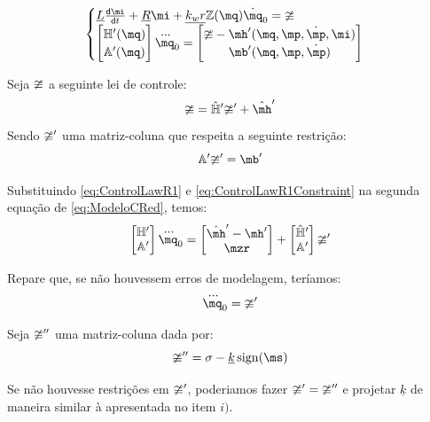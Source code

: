 \documentclass[a4paper,11pt,brazil,fleqn]{article}
\begin{document}
\begin{itemize}
$$
\begin{cases}
\underline{L} \frac{\dd \mi}{\dd t} + \underline{R} \mi + \underline{k_w r} \mZ (\mq) \dot{\mq}_0= \mup
\\
\begin{bmatrix}
\mH'(\mq) \\
\mA'(\mq)
\end{bmatrix}
\dddot{\mq}_0
=
\begin{bmatrix}
\mup - \mh'(\mq,\mp,\dot{\mp}, \mi) \\
\mb'(\mq,\mp,\dot{\mp})
\end{bmatrix}
\end{cases}
$$

Seja $\mathbb{\upsilon}$ a seguinte lei de controle:
\begin{equation} \label{eq:ControlLawR1}
\mup = \hat{\mH}' \mup' + \hat{\mh}'
\end{equation}
Sendo $\mathbb{\upsilon}'$ uma matriz-coluna que respeita a seguinte restri\c{c}\~ao:
\begin{equation} \label{eq:ControlLawR1Constraint}
\mA' \mup' = \mb'
\end{equation}

Substituindo \eqref{eq:ControlLawR1} e \eqref{eq:ControlLawR1Constraint} na segunda equa\c{c}\~ao de \eqref{eq:ModeloCRed}, temos:
\begin{equation}
\begin{bmatrix}
\mH' \\
\mA'
\end{bmatrix}
\dddot{\mq}_0
=
\begin{bmatrix}
\hat{\mh}' - \mh' \\
\mzr
\end{bmatrix}
+
\begin{bmatrix}
\hat{\mH}' \\
\mA'
\end{bmatrix}
\mup'
\end{equation}

Repare que, se n\~ao houvessem erros de modelagem, ter\'iamos:
\begin{equation}
\dddot{\mq}_0 = \mup'
\end{equation}

Seja $\mathbb{\upsilon}''$ uma matriz-coluna dada por:
\begin{equation}
\mup'' = \sigma - \underline{k} \sign(\ms)
\end{equation}

Se n\~ao houvesse restri\c{c}\~oes em $\mathbb{\upsilon}'$,  poderiamos fazer $ \mathbb{\upsilon}' = \mathbb{\upsilon}'' $ e projetar $\underline{k}$ de maneira similar \`a apresentada no item $i)$.


\end{itemize}
\end{document}
